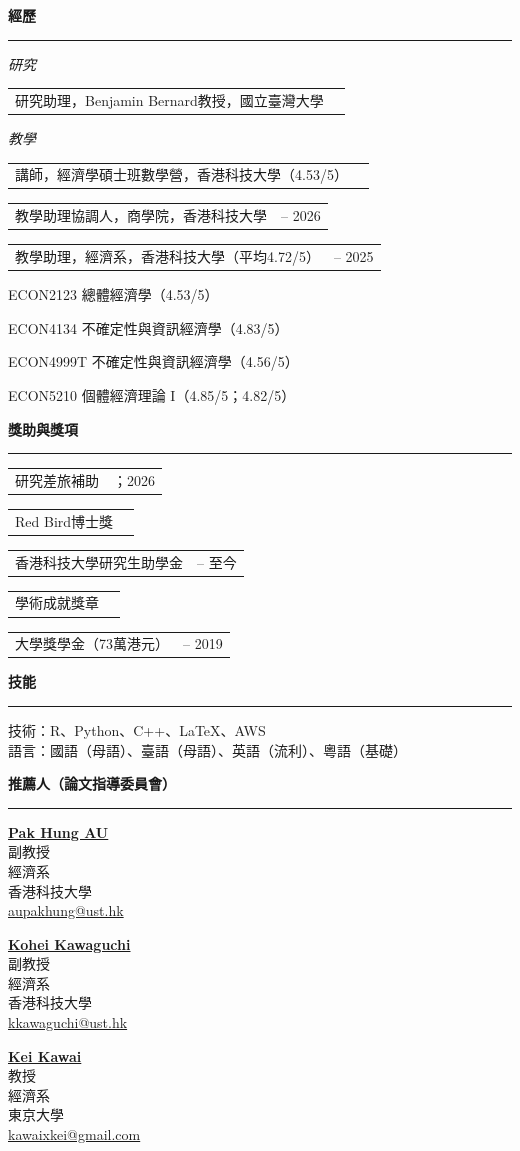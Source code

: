 \documentclass[11pt,letterpaper]{article}
\makeatletter
\newlength{\cvdatecol}
\newcommand{\sectionheader}[1]{%
  \vspace{0.55em}
  {\large\bfseries #1}\\[-0.15em]
  \rule{\textwidth}{0.4pt}\par
  \vspace{0.25em}
}
\newcommand{\cvline}[3][0em]{%
  \par\nobreak
  \noindent\hspace*{#1}%
  \begin{tabularx}{\dimexpr\textwidth-#1\relax}{@{}X@{\hspace{0.75em}}>{\raggedleft\arraybackslash}p{\cvdatecol}@{}}
  #2 & #3 \\
  \end{tabularx}%
}
\newcommand{\courseline}[1]{%
  \par\addvspace{0.28em}%
  \noindent\hspace*{3.2em}#1\par
}
\makeatother
\begin{document}
\sectionheader{經歷}
{
\textit{研究}\\[-0.5em]
\cvline[1.5em]{研究助理，Benjamin Bernard教授，國立臺灣大學}{2020}

\vspace{-0.1em}
\textit{教學}\\[-0.5em]
\cvline[1.5em]{講師，經濟學碩士班數學營，香港科技大學（4.53/5）}{2026}
\vspace{-0.12em}
\cvline[1.5em]{教學助理協調人，商學院，香港科技大學}{2025 -- 2026}
\vspace{-0.12em}
\cvline[1.5em]{教學助理，經濟系，香港科技大學（平均4.72/5）}{2020 -- 2025}
\vspace{0.1em}
\courseline{ECON2123 總體經濟學（4.53/5）}
\courseline{ECON4134 不確定性與資訊經濟學（4.83/5）}
\courseline{ECON4999T 不確定性與資訊經濟學（4.56/5）}
\courseline{ECON5210 個體經濟理論 I（4.85/5；4.82/5）}
}

\sectionheader{獎助與獎項}
{
\cvline[1.5em]{研究差旅補助}{2023；2026}
\vspace{-0.12em}
\cvline[1.5em]{Red Bird博士獎}{2022}
\vspace{-0.12em}
\cvline[1.5em]{香港科技大學研究生助學金}{2020 -- 至今}
\vspace{-0.12em}
\cvline[1.5em]{學術成就獎章}{2019}
\vspace{-0.12em}
\cvline[1.5em]{大學獎學金（73萬港元）}{2015 -- 2019}
}

\sectionheader{技能}
技術：R、Python、C++、\LaTeX、AWS\\
語言：國語（母語）、臺語（母語）、英語（流利）、粵語（基礎）

\sectionheader{推薦人（論文指導委員會）}
{
\noindent
\begin{minipage}[t]{0.48\textwidth}
\textbf{\href{https://aupakhung.weebly.com/}{Pak Hung AU}}\\
副教授\\
經濟系\\
香港科技大學\\
\href{mailto:aupakhung@ust.hk}{aupakhung@ust.hk}
\end{minipage}\hfill
\begin{minipage}[t]{0.48\textwidth}
\textbf{\href{https://www.kohei-kawaguchi.com/}{Kohei Kawaguchi}}\\
副教授\\
經濟系\\
香港科技大學\\
\href{mailto:kkawaguchi@ust.hk}{kkawaguchi@ust.hk}
\end{minipage}

\vspace{1.0em}
\noindent
\begin{minipage}[t]{0.48\textwidth}
\textbf{\href{https://www.e.u-tokyo.ac.jp/fservice/faculty/kawai/kawai-e/kawai01-e.html}{Kei Kawai}}\\
教授\\
經濟系\\
東京大學\\
\href{mailto:kawaixkei@gmail.com}{kawaixkei@gmail.com}
\end{minipage}
}
\end{document}
